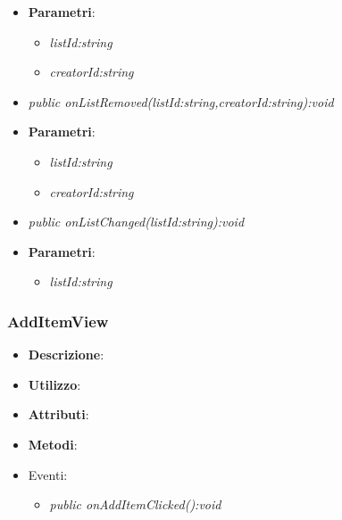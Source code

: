 \begin{itemize}
\begin{itemize}
			\item{\textbf{Parametri}: \begin{itemize}
			\item \textit{listId:string}\\

			\item \textit{creatorId:string}\\

			\end{itemize}}
	\item \textit{public onListRemoved(listId:string,creatorId:string):void}\\

			\item{\textbf{Parametri}: \begin{itemize}
			\item \textit{listId:string}\\

			\item \textit{creatorId:string}\\

			\end{itemize}}
	\item \textit{public onListChanged(listId:string):void}\\

			\item{\textbf{Parametri}: \begin{itemize}
			\item \textit{listId:string}\\

			\end{itemize}}
	\end{itemize}
\end{itemize}

\subsubsection{AddItemView}
\begin{itemize}
\item \textbf{Descrizione}: 
\item \textbf{Utilizzo}:
\item \textbf{Attributi}: 
\item \textbf{Metodi}:
\item{Eventi}:
	\begin{itemize}	
	\item \textit{public onAddItemClicked():void}\\

	\end{itemize}
\end{itemize}

